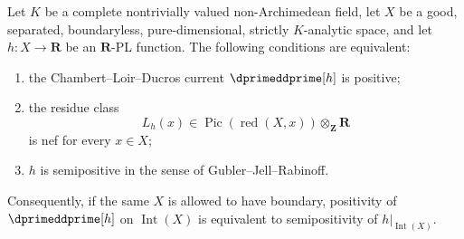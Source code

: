 \begin{theorem}
\label{thm:p01-real-pl-positive-current-candidate}
Let \(K\) be a complete nontrivially valued non-Archimedean field, let \(X\)
be a good, separated, boundaryless, pure-dimensional, strictly
\(K\)-analytic space, and let
\(h:X\to\mathbf R\) be an \(\mathbf R\)-PL function.  The following conditions
are equivalent:
\begin{enumerate}
\item the Chambert--Loir--Ducros current
      \(\dprimeddprime[h]\) is positive;
\item the residue class
      \[
      L_h(x)\in\operatorname{Pic}(\operatorname{red}(X,x))
                    \otimes_{\mathbf Z}\mathbf R
      \]
      is nef for every \(x\in X\);
\item \(h\) is semipositive in the sense of Gubler--Jell--Rabinoff.
\end{enumerate}
Consequently, if the same \(X\) is allowed to have boundary, positivity of
\(\dprimeddprime[h]\) on \(\operatorname{Int}(X)\) is equivalent to
semipositivity of \(h|_{\operatorname{Int}(X)}\).
\end{theorem}

